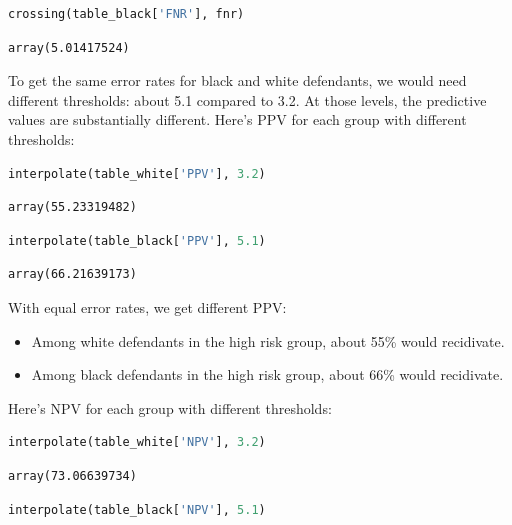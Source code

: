 \begin{lstlisting}[language=Python,style=source]
crossing(table_black['FNR'], fnr)
\end{lstlisting}

\begin{lstlisting}[style=output]
array(5.01417524)
\end{lstlisting}

To get the same error rates for black and white defendants, we would
need different thresholds: about 5.1 compared to 3.2. At those levels,
the predictive values are substantially different. Here's PPV for each
group with different thresholds:

\begin{lstlisting}[language=Python,style=source]
interpolate(table_white['PPV'], 3.2)
\end{lstlisting}

\begin{lstlisting}[style=output]
array(55.23319482)
\end{lstlisting}

\begin{lstlisting}[language=Python,style=source]
interpolate(table_black['PPV'], 5.1)
\end{lstlisting}

\begin{lstlisting}[style=output]
array(66.21639173)
\end{lstlisting}

With equal error rates, we get different PPV:

\begin{itemize}
\item
  Among white defendants in the high risk group, about 55\% would
  recidivate.
\item
  Among black defendants in the high risk group, about 66\% would
  recidivate.
\end{itemize}

Here's NPV for each group with different thresholds:

\begin{lstlisting}[language=Python,style=source]
interpolate(table_white['NPV'], 3.2)
\end{lstlisting}

\begin{lstlisting}[style=output]
array(73.06639734)
\end{lstlisting}

\begin{lstlisting}[language=Python,style=source]
interpolate(table_black['NPV'], 5.1)
\end{lstlisting}

